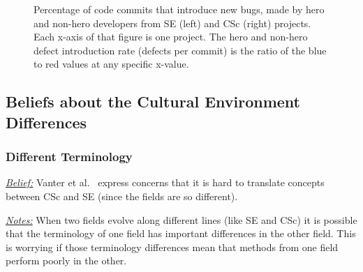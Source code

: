 \documentclass[conference,10pt]{IEEEtran}
\begin{document}
\begin{figure}[!t]
\vspace{-25pt}
\vspace{-20pt}
\caption{Percentage of code commits that introduce new bugs, made by hero and non-hero developers from SE (left) and CSc (right) projects.
Each x-axis of that figure is one project. The hero and non-hero defect introduction rate (defects per commit) is the ratio of the blue to red values
at any specific x-value.
}\label{fig:heroes}
\vspace{-15pt}
\end{figure}


\subsection{Beliefs about the Cultural Environment Differences}



\subsubsection{Different Terminology}\label{terms}
\noindent \textit{\underline{Belief:}} 
Vanter et al.~\cite{faulk09_secs, easterbrook_cs, boyle09_lessons} express concerns
that it is hard to translate concepts between  CSc and SE (since the fields are so different). 

\noindent \textit{\underline{Notes:}} When two fields evolve along different
lines (like SE and CSc) it is possible that the terminology of one field has important
differences in the other field. This is worrying if those terminology differences mean that methods from one field perform poorly in the other.
\end{document}
